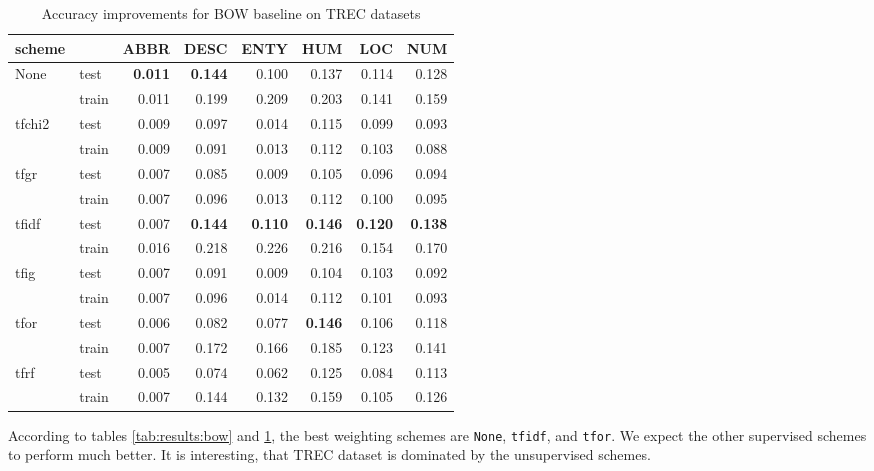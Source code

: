 \begin{table}[H]
\begin{center}

\begin{tabular}{llrrrrrr}
\toprule
scheme &&  ABBR &  DESC &  ENTY &  HUM &  LOC &  NUM \\

\midrule
None & test & \textbf{0.011} & \textbf{0.144} & 0.100 &0.137 &0.114 &0.128 \\
{} & train & 0.011 & 0.199 & 0.209 &0.203 &0.141 &0.159 \\
tfchi2 & test & 0.009 & 0.097 & 0.014 &0.115 &0.099 &0.093 \\
{} & train & 0.009 & 0.091 & 0.013 &0.112 &0.103 &0.088 \\
tfgr & test & 0.007 & 0.085 & 0.009 &0.105 &0.096 &0.094 \\
{} & train & 0.007 & 0.096 & 0.013 &0.112 &0.100 &0.095 \\
tfidf & test & 0.007 & \textbf{0.144} & \textbf{0.110} &\textbf{0.146} &\textbf{0.120} &\textbf{0.138} \\
{} & train & 0.016 & 0.218 & 0.226 &0.216 &0.154 &0.170 \\
tfig & test & 0.007 & 0.091 & 0.009 &0.104 &0.103 &0.092 \\
{} & train & 0.007 & 0.096 & 0.014 &0.112 &0.101 &0.093 \\
tfor & test & 0.006 & 0.082 & 0.077 &\textbf{0.146} &0.106 &0.118 \\
{} & train & 0.007 & 0.172 & 0.166 &0.185 &0.123 &0.141 \\
tfrf & test & 0.005 & 0.074 & 0.062 &0.125 &0.084 &0.113 \\
{} & train & 0.007 & 0.144 & 0.132 &0.159 &0.105 &0.126 \\
\bottomrule
\end{tabular}

\caption[Accuracy improvements for BOW baseline on TREC datasets]{Accuracy improvements for BOW baseline on TREC datasets}
\label{tab:results:bow:trec}
\end{center}
\end{table}
\pagebreak

    
    According to tables \ref{tab:results:bow} and \ref{tab:results:bow:trec}, 
    the best weighting schemes are \texttt{None}, \texttt{tfidf}, and \texttt{tfor}.
    We expect the other supervised schemes to perform much better.
    It is interesting, that TREC dataset is dominated by the unsupervised schemes.
    
